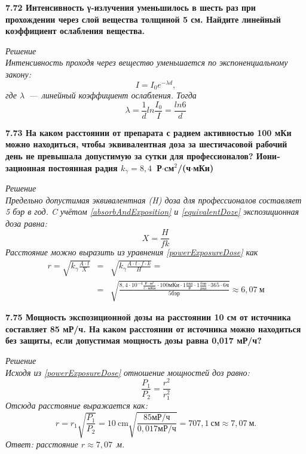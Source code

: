 \documentclass[a4paper, fontsize=14pt]{extreport}
\begin{document}
{\textbf{7.72 Интенсивность γ-излучения уменьшилось в шесть раз при прохождении через слой вещества толщиной 5 см. Найдите линейный коэффициент ослабления вещества.}

\textit{Решение \\
Интенсивность проходя через вещество уменьшается по экспоненциальному закону:
\begin{equation}
  I = I_0e^{-\lambda d},
\end{equation}
где $\lambda$~---~линейный коэффициент ослабления. Тогда
\begin{equation}
  \lambda = \frac{1}{d} ln\frac{I_0}{I} = \frac{ln6}{d}
\end{equation}
}

\textbf{7.73 На каком расстоянии от препарата с радием активностью 100 мКи можно находиться, чтобы эквивалентная доза за шестичасовой рабочий день не превышала допустимую за сутки для профессионалов? Иони­зационная постоянная радия $k_\gamma = 8,4$~Р$\cdot$cм$^{2}$/(ч$\cdot$мКи)}

\textit{Решение \\
Предельно допустимая эквивалентная (H) доза для профессионалов составляет 5 бэр в год. 
C учётом \ref{absorbAndExposition} и \ref{equivalentDoze} экспозиционная доза равна:
\begin{equation}
  X = \frac{H}{fk}
\end{equation}
Расстояние можно выразить из уравнения \ref{powerExposureDose} как 
\begin{eqnarray*}
  r = \sqrt{k_\gamma\frac{A \cdot t}{X}} & = & \sqrt{k_\gamma\frac{A \cdot t\cdot f \cdot k}{H}}  = \\ 
  & =& \sqrt{\frac{8,4\cdot 10^{-4}\frac{\text{Р}\cdot\text{м}^2}{c\cdot\text{мКи}}\cdot 100\text{мКи}\cdot 1\frac{\text{рад}}{\text{Р}} \cdot 1\frac{\text{бэр}}{\text{рад}} \cdot 365 \cdot 6 \text{ч}}{5\text{бэр}}} \approx 6,07\: \text{м}
\end{eqnarray*}
}

\textbf{7.75 Мощность экспозиционной дозы на расстоянии 10 см от источника составляет 85 мР/ч. На каком расстоянии от источника можно находиться без защиты, если допустимая мощность дозы равна 0,017 мР/ч?}

\textit{Решение \\
%
Исходя из \ref{powerExposureDose} отношение мощностей доз равно:
\begin{equation}
  \frac{P_1}{P_2} = \frac{r^2}{r_1^2}
\end{equation}
Отсюда расстояние выражается как:
\begin{equation}
  r = r_1\sqrt{\frac{P_1}{P_2}} = 10\: \text{cm} \sqrt{\frac{85\text{мР/ч}}{0,017\text{мР/ч}}} = 707,1\:\text{см} \approx 7,07\: \text{м}.
\end{equation}
Ответ: расстояние $r \approx 7,07$~м.
}

}
\end{document}

